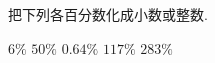 把下列各百分数化成小数或整数.
\begin{subquestions}
    \subquestion $6\%$
    \subquestion $50\%$
    \subquestion $0.64\%$
    \subquestion $117\%$
    \subquestion $283\%$

\end{subquestions}